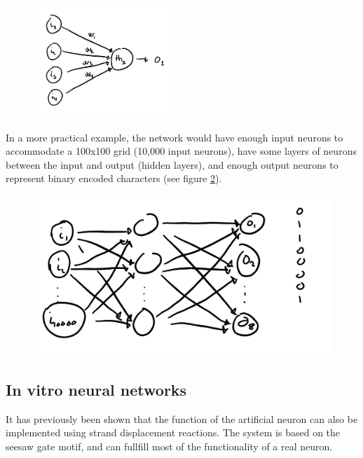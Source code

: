 \begin{figure}[H]
\centering
\includegraphics[width=200]{images/neuralnetwork_neurons.png}
\caption{}
\label{neuralnetwork_neurons}
\end{figure}

 In a more practical example, the network would have enough input neurons to accommodate a 100x100 grid (10,000 input neurons), have some layers of neurons between the input and output (hidden layers), and enough output neurons to represent binary encoded characters (see figure \ref{neuralnetwork_ocr}).

 \begin{figure}[H]
 \centering
 \includegraphics[width=\columnwidth]{images/neuralnetwork_ocr.png}
 \caption{}
 \label{neuralnetwork_ocr}
 \end{figure}

\subsection{In vitro neural networks}
It has previously been shown that the function of the artificial neuron can also be implemented using strand displacement reactions. The system is based on the seesaw gate motif, and can fullfill most of the functionality of a real neuron.

